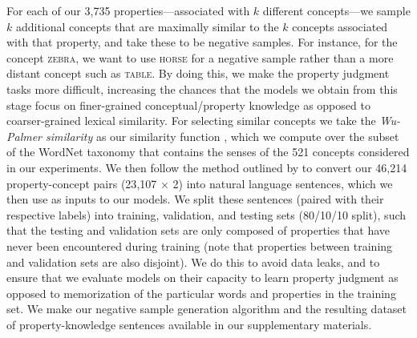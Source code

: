 \documentclass[10pt,letterpaper]{article}
\newcommand{\ake}[1]{\textcolor{blue}{$_{AE}$[#1]}}
\newcommand{\todo}[1]{\textcolor{purple}{$_{todo}$[#1]}}
\newcommand{\properties}{\mathcal{P}}
\begin{document}
{For each of our 3{,}735 properties---associated with $k$ different concepts---we sample $k$ additional concepts that are maximally similar to the $k$ concepts associated with that property, and take these to be negative samples. For instance, for the concept \textsc{zebra}, we want to use \textsc{horse} for a negative sample rather than a more distant concept such as \textsc{table}.
By doing this, we make the property judgment tasks more difficult, increasing the chances that the models we obtain from this stage focus on finer-grained conceptual/property knowledge as opposed to coarser-grained lexical similarity.
For selecting similar concepts we take the \textit{Wu-Palmer similarity} as our similarity function \citep{wu-palmer-1994-verb}, which we compute over the subset of the WordNet taxonomy \citep{miller1995wordnet} that contains the senses of the 521 concepts considered in our experiments. We then follow the method outlined by \citet{bhatia2020transformer} to convert our 46{,}214 property-concept pairs (23{,}107 $\times$ 2) into natural language sentences, which we then use as inputs to our models. We split these sentences (paired with their respective labels) into training, validation, and testing sets (80/10/10 split), such that the testing and validation sets are only composed of properties that have never been encountered during training (note that properties between training and validation sets are also disjoint). 
We do this to avoid data leaks, and to ensure that we evaluate models on their capacity to learn property judgment as opposed to memorization of the particular words and properties in the training set. We make our negative sample generation algorithm and the resulting dataset of property-knowledge sentences available in our supplementary materials.}
\end{document}
